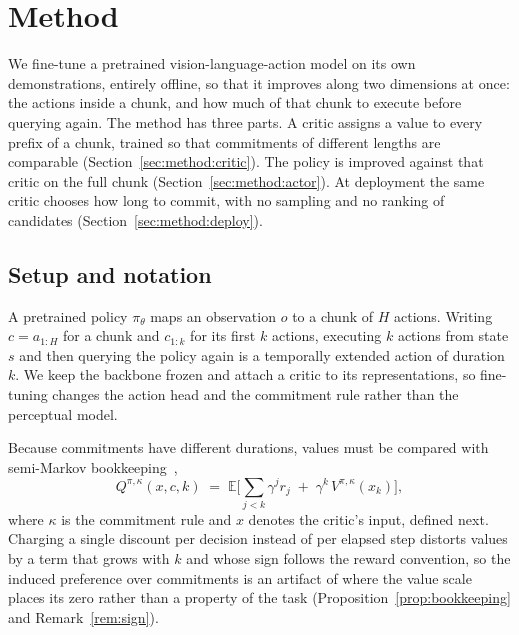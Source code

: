 
\section{Method}
\label{sec:method}

We fine-tune a pretrained vision-language-action model on its own demonstrations, entirely offline,
so that it improves along two dimensions at once: the actions inside a chunk, and how much of that
chunk to execute before querying again. The method has three parts. A critic assigns a value to
every prefix of a chunk, trained so that commitments of different lengths are comparable
(Section~\ref{sec:method:critic}). The policy is improved against that critic on the full chunk
(Section~\ref{sec:method:actor}). At deployment the same critic chooses how long to commit, with no
sampling and no ranking of candidates (Section~\ref{sec:method:deploy}).

\subsection{Setup and notation}
\label{sec:method:setup}

A pretrained policy $\pi_\theta$ maps an observation $o$ to a chunk of $H$ actions. Writing
$c=a_{1:H}$ for a chunk and $c_{1:k}$ for its first $k$ actions, executing $k$ actions from state
$s$ and then querying the policy again is a temporally extended action of duration $k$. We keep the
backbone frozen and attach a critic to its representations, so fine-tuning changes the action
head and the commitment rule rather than the perceptual model.

Because commitments have different durations, values must be compared with semi-Markov
bookkeeping~\citep{sutton1999options, bradtke1994smdp},
\begin{equation}
\label{eq:method-smdp}
Q^{\pi,\kappa}(x, c, k) \;=\; \mathbb E\Big[\textstyle\sum_{j<k}\gamma^{j} r_j \;+\; \gamma^{k}\,
V^{\pi,\kappa}(x_k)\Big],
\end{equation}
where $\kappa$ is the commitment rule and $x$ denotes the critic's input, defined next. Charging a
single discount per decision instead of per elapsed step distorts values by a term that grows with
$k$ and whose sign follows the reward convention, so the induced preference over commitments is an
artifact of where the value scale places its zero rather than a property of the task
(Proposition~\ref{prop:bookkeeping} and Remark~\ref{rem:sign}).

